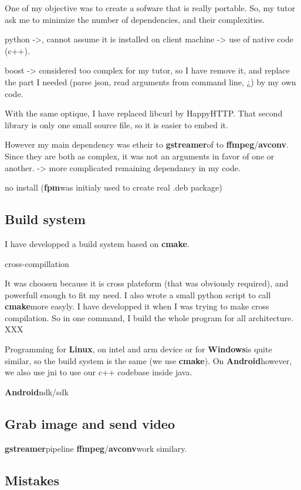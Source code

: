 \documentclass[a4paper,11pt]{custom}
\newcommand{\avconv}{\textbf{avconv}}
\newcommand{\ffmpeg}{\textbf{ffmpeg}}
\newcommand{\gstreamer}{\textbf{gstreamer}}
\newcommand{\cmake}{\textbf{cmake}}
\newcommand{\fpm}{\textbf{fpm}}
\newcommand{\linux}{\textbf{Linux}}
\newcommand{\win}{\textbf{Windows}}
\newcommand{\android}{\textbf{Android}}
\begin{document}
One of my objective was to create a sofware that is really portable. So, my
tutor ask me to minimize the number of dependencies, and their complexities.

python ->, cannot assume it is installed on client machine -> use of native code
(c++).

boost -> considered too complex for my tutor, so I have remove it, and replace
the part I needed (parse json, read arguments from command line, ¿) by my own
code.

With the same optique, I have replaced libcurl by HappyHTTP. That second library
is only one small source file, so it is easier to embed it.

However my main dependency was etheir to \gstreamer of to \ffmpeg/\avconv. Since
they are both as complex, it was not an arguments in favor of one or another.
-> more complicated remaining dependancy in my code.


no install (\fpm was initialy used to create real .deb package)

\subsection{Build system}

I have developped a build system based on \cmake.

cross-compillation

It was choosen because it is
cross plateform (that was obviously required), and powerfull enough to fit my
need. I also wrote a small python script to call \cmake more easyly. I have
developped it when I was trying to make cross compilation. So in one command, I
build the whole program for all architecture. XXX

Programming for \linux, on intel and arm device or for \win is quite similar, so
the build system is the same (we use \cmake). On \android however, we also use
jni to use our c++ codebase inside java.

\android ndk/sdk

\subsection{Grab image and send video}

\gstreamer pipeline
\ffmpeg/\avconv work similary.

\subsection{Mistakes}
\end{document}
